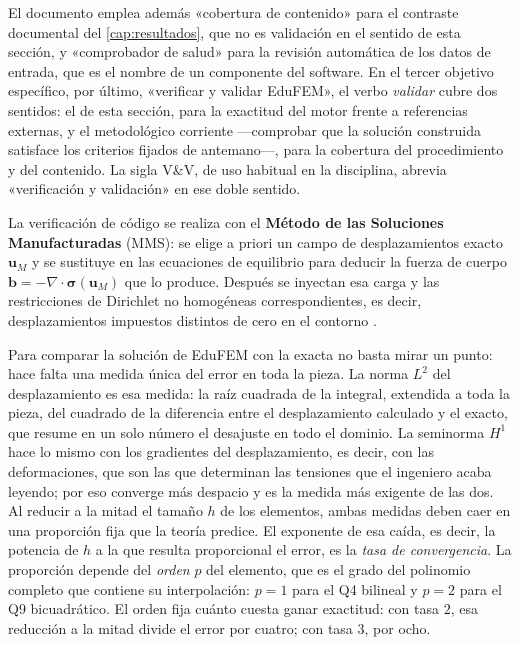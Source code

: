 El documento emplea además «cobertura de contenido» para el contraste documental del \autoref{cap:resultados}, que no es validación en el sentido de esta sección, y «comprobador de salud» para la revisión automática de los datos de entrada, que es el nombre de un componente del software. En el tercer objetivo específico, por último, «verificar y validar EduFEM», el verbo \emph{validar} cubre dos sentidos: el de esta sección, para la exactitud del motor frente a referencias externas, y el metodológico corriente ---comprobar que la solución construida satisface los criterios fijados de antemano---, para la cobertura del procedimiento y del contenido. La sigla V\&V, de uso habitual en la disciplina, abrevia «verificación y validación» en ese doble sentido.

La verificación de código se realiza con el \textbf{Método de las Soluciones Manufacturadas} (MMS): se elige a priori un campo de desplazamientos exacto $\bm{u}_M$ y se sustituye en las ecuaciones de equilibrio para deducir la fuerza de cuerpo $\bm{b} = -\nabla\cdot\bm{\sigma}(\bm{u}_M)$ que lo produce. Después se inyectan esa carga y las restricciones de Dirichlet no homogéneas correspondientes, es decir, desplazamientos impuestos distintos de cero en el contorno \autocites[pp.~21, 26]{salari2000mms}[pp.~219-222]{oberkampf2010vv}.

Para comparar la solución de EduFEM con la exacta no basta mirar un punto: hace falta una medida única del error en toda la pieza. La norma $L^2$ del desplazamiento es esa medida: la raíz cuadrada de la integral, extendida a toda la pieza, del cuadrado de la diferencia entre el desplazamiento calculado y el exacto, que resume en un solo número el desajuste en todo el dominio. La seminorma $H^1$ hace lo mismo con los gradientes del desplazamiento, es decir, con las deformaciones, que son las que determinan las tensiones que el ingeniero acaba leyendo; por eso converge más despacio y es la medida más exigente de las dos. Al reducir a la mitad el tamaño $h$ de los elementos, ambas medidas deben caer en una proporción fija que la teoría predice. El exponente de esa caída, es decir, la potencia de $h$ a la que resulta proporcional el error, es la \emph{tasa de convergencia}. La proporción depende del \emph{orden} $p$ del elemento, que es el grado del polinomio completo que contiene su interpolación: $p = 1$ para el Q4 bilineal y $p = 2$ para el Q9 bicuadrático. El orden fija cuánto cuesta ganar exactitud: con tasa $2$, esa reducción a la mitad divide el error por cuatro; con tasa $3$, por ocho.

